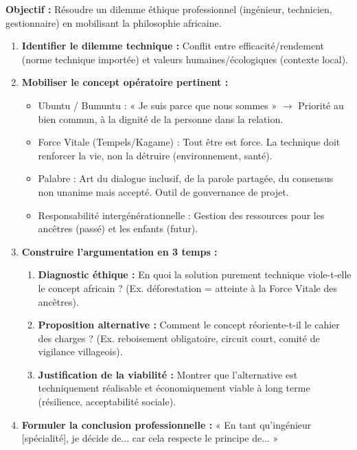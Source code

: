 \documentclass[11pt]{article}
\newcommand{\cle}[1]{{\popxbold\color{popdark}#1}}
\begin{document}
\begin{methode}
\textbf{Objectif :} Résoudre un dilemme éthique professionnel (ingénieur, technicien, gestionnaire) en mobilisant la philosophie africaine.
\begin{enumerate}
    \item \textbf{Identifier le dilemme technique :} Conflit entre \cle{efficacité/rendement} (norme technique importée) et \cle{valeurs humaines/écologiques} (contexte local).
    \item \textbf{Mobiliser le concept opératoire pertinent :}
        \begin{itemize}
            \item \cle{Ubuntu / Bumuntu} : « Je suis parce que nous sommes » $\rightarrow$ Priorité au \cle{bien commun}, à la \cle{dignité} de la personne dans la relation.
            \item \cle{Force Vitale} (Tempels/Kagame) : Tout être est force. La technique doit \cle{renforcer} la vie, non la détruire (environnement, santé).
            \item \cle{Palabre} : Art du dialogue inclusif, de la \cle{parole partagée}, du consensus non unanime mais accepté. Outil de \cle{gouvernance} de projet.
            \item \cle{Responsabilité intergénérationnelle} : Gestion des ressources pour les ancêtres (passé) et les enfants (futur).
        \end{itemize}
    \item \textbf{Construire l'argumentation en 3 temps :}
        \begin{enumerate}
            \item \textbf{Diagnostic éthique :} En quoi la solution purement technique viole-t-elle le concept africain ? (Ex. déforestation = atteinte à la Force Vitale des ancêtres).
            \item \textbf{Proposition alternative :} Comment le concept réoriente-t-il le cahier des charges ? (Ex. reboisement obligatoire, circuit court, comité de vigilance villageois).
            \item \textbf{Justification de la viabilité :} Montrer que l'alternative est \cle{techniquement réalisable} et \cle{économiquement viable} à long terme (résilience, acceptabilité sociale).
        \end{enumerate}
    \item \textbf{Formuler la conclusion professionnelle :} « En tant qu'ingénieur [spécialité], je décide de... car cela respecte le principe de... »
\end{enumerate}
\end{methode}
\end{document}
